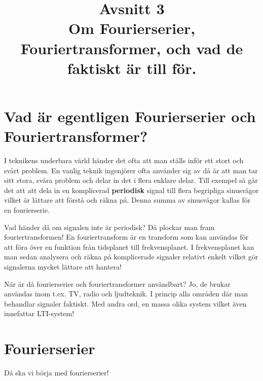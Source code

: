 \documentclass{article}
\title{Avsnitt 3 \\
\large Om Fourierserier, Fouriertransformer, och vad de faktiskt är till för.}
\author{ }
\date{}
\begin{document}
\maketitle

\section{Vad är egentligen Fourierserier och Fouriertransformer?}
I teknikens underbara värld händer det ofta att man ställs inför ett stort och svårt problem. En vanlig teknik ingenjörer ofta använder sig av då är att man tar sitt stora, svåra problem och delar in det i flera enklare delar. Till exempel så går det att att dela in en komplicerad \textbf{periodisk} signal till flera begripliga sinusvågor vilket är lättare att förstå och räkna på. Denna summa av sinusvågor kallas för en fourierserie. 

Vad händer då om signalen inte är periodisk? Då plockar man fram fouriertransformen! En fouriertransform är en transform som kan användas för att föra över en funktion från tidsplanet till frekvensplanet. I frekvensplanet kan man sedan analysera och räkna på komplicerade signaler relativt enkelt vilket gör signalerna mycket lättare att hantera! 

När är då fourierserier och fouriertransformer användbart? Jo, de brukar användas inom t.ex. TV, radio och ljudteknik. I princip alla områden där man behandlar signaler faktiskt. Med andra ord, en massa olika system vilket även innefattar LTI-system!

\section{Fourierserier}

Då ska vi börja med fourierserier!
\end{document}
